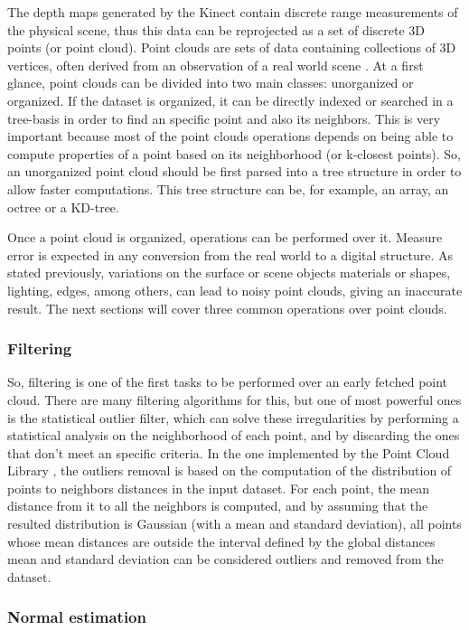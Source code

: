 \documentclass[msc, a4paper, classic, en]{ufbathesis}
\begin{document}
The depth maps generated by the Kinect contain discrete range measurements of the physical scene, thus this data can be reprojected as a set of discrete 3D points (or point cloud). Point clouds are sets of data containing collections of 3D vertices, often derived from an observation of a real world scene \cite{price2012}. At a first glance, point clouds can be divided into two main classes: unorganized or organized. If the dataset is organized, it can be directly indexed or searched in a tree-basis in order to find an specific point and also its neighbors. This is very important because most of the point clouds operations depends on being able to compute properties of a point based on its neighborhood (or k-closest points). So, an unorganized point cloud should be first parsed into a tree structure in order to allow faster computations. This tree structure can be, for example, an array, an octree or a KD-tree.

Once a point cloud is organized, operations can be performed over it. Measure error is expected in any conversion from the real world to a digital structure. As stated previously, variations on the surface or scene objects materials or shapes, lighting, edges, among others, can lead to noisy point clouds, giving an inaccurate result. The next sections will cover three common operations over point clouds.

\subsubsection{Filtering}

So, filtering is one of the first tasks to be performed over an early fetched point cloud. There are many filtering algorithms for this, but one of most powerful ones is the statistical outlier filter, which can solve these irregularities by performing a statistical analysis on the neighborhood of each point, and by discarding the ones that don't meet an specific criteria. In the one implemented by the Point Cloud Library \cite{pclstatout}, the outliers removal is based on the computation of the distribution of points to neighbors distances in the input dataset. For each point, the mean distance from it to all the neighbors is computed, and by assuming that the resulted distribution is Gaussian (with a mean and standard deviation), all points whose mean distances are outside the interval defined by the global distances mean and standard deviation can be considered outliers and removed from the dataset.

\subsubsection{Normal estimation}
\end{document}

